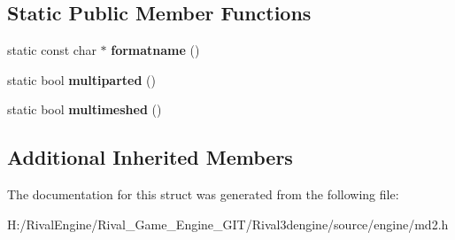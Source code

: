 \subsection*{Static Public Member Functions}
\begin{DoxyCompactItemize}
\item 
\mbox{\label{structmd2_a649e483e74d12875f908a0e3fe941469}} 
static const char $\ast$ {\bfseries formatname} ()
\item 
\mbox{\label{structmd2_a36a4cf0d9a3da75848674e178cd8954e}} 
static bool {\bfseries multiparted} ()
\item 
\mbox{\label{structmd2_a481f4c8e87630c64aea5cd48be1100ba}} 
static bool {\bfseries multimeshed} ()
\end{DoxyCompactItemize}
\subsection*{Additional Inherited Members}


The documentation for this struct was generated from the following file\+:\begin{DoxyCompactItemize}
\item 
H\+:/\+Rival\+Engine/\+Rival\+\_\+\+Game\+\_\+\+Engine\+\_\+\+G\+I\+T/\+Rival3dengine/source/engine/md2.\+h\end{DoxyCompactItemize}
